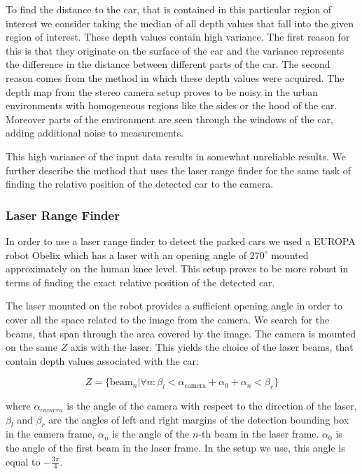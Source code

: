 To find the distance to the car, that is contained in this particular region
of interest we consider taking the median of all depth values that fall into
the given region of interest. These depth values contain high variance. The
first reason for this is that they originate on the surface of the car and the
variance represents the difference in the distance between different parts of
the car. The second reason comes from the method in which these depth values
were acquired. The depth map from the stereo camera setup proves to be noisy
in the urban environments with homogeneous regions like the sides or the hood
of the car. Moreover parts of the environment are seen through the windows of
the car, adding additional noise to measurements.

This high variance of the input data results in somewhat unreliable results.
We further describe the method that uses the laser range finder for the same
task of finding the relative position of the detected car to the camera.

\subsubsection{Laser Range Finder}\label{ssub:laser_range_finder}

In order to use a laser range finder to detect the parked cars we used a
EUROPA robot Obelix which has a laser with an opening angle of $270^\circ$
mounted approximately on the human knee level. This setup proves to be more
robust in terms of finding the exact relative position of the detected car.

The laser mounted on the robot provides a sufficient opening angle in order to
cover all the space related to the image from the camera. We search for the
beams, that span through the area covered by the image. The camera is mounted
on the same $Z$ axis with the laser. This yields the choice of the laser
beams, that contain depth values associated with the car:

\begin{equation}
Z = \{ \mbox{beam}_n | \forall n : \beta_{l} < \alpha_{\mbox{camera}} + \alpha_{0} + \alpha_{n} < \beta_{r} \}
\end{equation}

where $\alpha_{camera}$ is the angle of the camera with respect to the
direction of the laser, $\beta_{l}$ and $\beta_{r}$ are the angles of left and
right margins of the detection bounding box in the camera frame, $\alpha_{n}$
is the angle of the $n$-th beam in the laser frame. $\alpha_{0}$ is the angle
of the first beam in the laser frame. In the setup we use, this angle is equal
to $-\frac{3\pi}{4}$.

